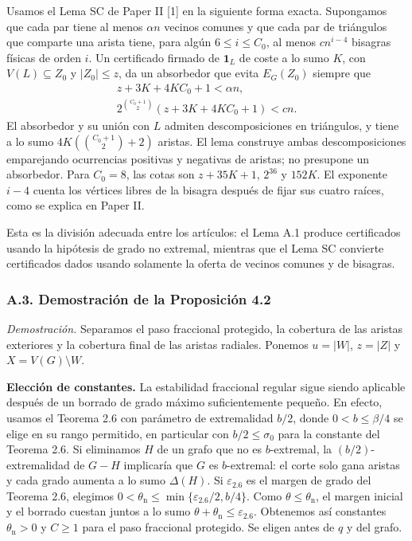 \documentclass[spanish,11pt,a4paper]{article}
\begin{document}
Usamos el Lema SC de Paper II {[}1{]} en la siguiente forma exacta. Supongamos que cada par tiene al menos \(\alpha n\) vecinos comunes y que cada par de triángulos que comparte una arista tiene, para algún \(6\le i\le C_0\), al menos \(cn^{i-4}\) bisagras físicas de orden \(i\). Un certificado firmado de \(\mathbf1_L\) de coste a lo sumo \(K\), con \(V(L)\subseteq Z_0\) y \(|Z_0|\le z\), da un absorbedor que evita \(E_G(Z_0)\) siempre que \[\begin{gathered}
z+3K+4KC_0+1<\alpha n,\\
2^{\binom{C_0+1}{2}}(z+3K+4KC_0+1)<cn.
\end{gathered}
\tag{A.3}\] El absorbedor y su unión con \(L\) admiten descomposiciones en triángulos, y tiene a lo sumo \(4K(\binom{C_0+1}{2}+2)\) aristas. El lema construye ambas descomposiciones emparejando ocurrencias positivas y negativas de aristas; no presupone un absorbedor. Para \(C_0=8\), las cotas son \(z+35K+1\), \(2^{36}\) y \(152K\). El exponente \(i-4\) cuenta los vértices libres de la bisagra después de fijar sus cuatro raíces, como se explica en Paper II.

Esta es la división adecuada entre los artículos: el Lema A.1 produce certificados usando la hipótesis de grado no extremal, mientras que el Lema SC convierte certificados dados usando solamente la oferta de vecinos comunes y de bisagras.

\subsubsection{A.3. Demostración de la Proposición 4.2}\label{a.3.-demostraciuxf3n-de-la-proposiciuxf3n-4.2}

\emph{Demostración.} Separamos el paso fraccional protegido, la cobertura de las aristas exteriores y la cobertura final de las aristas radiales. Ponemos \(u=|W|\), \(z=|Z|\) y \(X=V(G)\setminus W\).

\textbf{Elección de constantes.} La estabilidad fraccional regular sigue siendo aplicable después de un borrado de grado máximo suficientemente pequeño. En efecto, usamos el Teorema 2.6 con parámetro de extremalidad \(b/2\), donde \(0<b\le\beta/4\) se elige en su rango permitido, en particular con \(b/2\le\sigma_0\) para la constante del Teorema 2.6. Si eliminamos \(H\) de un grafo que no es \(b\)-extremal, la \((b/2)\)-extremalidad de \(G-H\) implicaría que \(G\) es \(b\)-extremal: el corte solo gana aristas y cada grado aumenta a lo sumo \(\Delta(H)\). Si \(\varepsilon_{2.6}\) es el margen de grado del Teorema 2.6, elegimos \(0<\theta_{\mathrm n}\le\min\{\varepsilon_{2.6}/2,b/4\}\). Como \(\theta\le\theta_{\mathrm n}\), el margen inicial y el borrado cuestan juntos a lo sumo \(\theta+\theta_{\mathrm n}\le\varepsilon_{2.6}\). Obtenemos así constantes \(\theta_{\mathrm n}>0\) y \(C\ge1\) para el paso fraccional protegido. Se eligen antes de \(q\) y del grafo.
\end{document}
